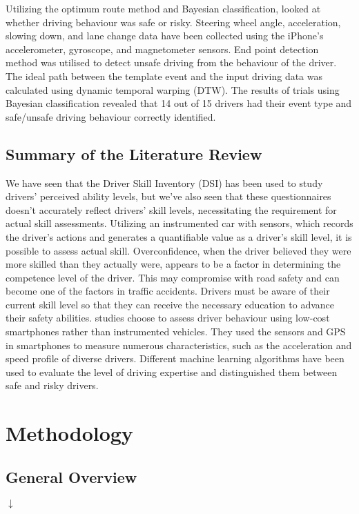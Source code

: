 \documentclass[12pt,letterpaper]{report}
\begin{document}
Utilizing the optimum route method and Bayesian classification, \textbf{\cite{eren2012estimating}} looked at whether driving behaviour was safe or risky. Steering wheel angle, acceleration, slowing down, and lane change data have been collected using the iPhone's accelerometer, gyroscope, and magnetometer sensors. End point detection method was utilised to detect unsafe driving from the behaviour of the driver. The ideal path between the template event and the input driving data was calculated using dynamic temporal warping (DTW). The results of trials using Bayesian classification revealed that 14 out of 15 drivers had their event type and safe/unsafe driving behaviour correctly identified.

\section{Summary of the Literature Review}
We have seen that the Driver Skill Inventory (DSI) has been used to study drivers' perceived ability levels, but we've also seen that these questionnaires doesn't accurately reflect drivers' skill levels, necessitating the requirement for actual skill assessments. Utilizing an instrumented car with sensors, which records the driver's actions and generates a quantifiable value as a driver's skill level, it is possible to assess actual skill. Overconfidence, when the driver believed they were more skilled than they actually were, appears to be a factor in determining the competence level of the driver. This may compromise with road safety and can become one of the factors in traffic accidents. Drivers must be aware of their current skill level so that they can receive the necessary education to advance their safety abilities.  studies choose to assess driver behaviour using low-cost smartphones rather than instrumented vehicles. They used the sensors and GPS in smartphones to measure numerous characteristics, such as the acceleration and speed profile of diverse drivers. Different machine learning algorithms have been used to evaluate the level of driving expertise and distinguished them between safe and risky drivers.  


\chapter{Methodology}
\section{General Overview}
\noindent{}
\begin{center}
$\downarrow$
\end{center}
\end{document}
